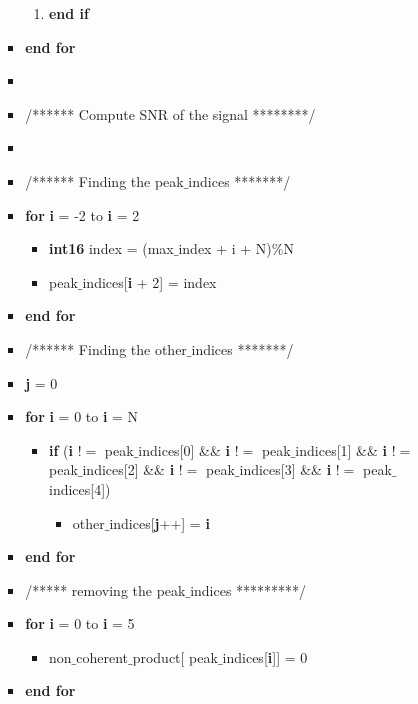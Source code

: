 \documentclass[journal,10pt,onecolumn]{article}
\begin{document}
\begin{itemize}
\begin{enumerate}
\begin{enumerate}
\begin{itemize}
\begin{enumerate}
               \item[] \textbf{end if}
            \end{enumerate}
            \item[] \textbf{end for} 
            \item[] 
            \item[] /****** Compute SNR of the signal ********/
            \item[] 
            \item[] /****** Finding the peak$\_$indices *******/
            \item[] \textbf{for} \textbf{i} = -2 to \textbf{i} = 2
            \begin{itemize}
                \item[] \textbf{int16} index = (max$\_$index + i + N)\%N
                \item[] peak$\_$indices[\textbf{i} + 2] = index
            \end{itemize}
            \item[] \textbf{end for}
            \item[] /****** Finding the other$\_$indices *******/
            \item[] \textbf{j} = 0
            \item[] \textbf{for} \textbf{i} = 0 to \textbf{i} = N
            \begin{itemize}
                \item[] \textbf{if} (\textbf{i} $!=$ peak$\_$indices[0] \&\& \textbf{i} $!=$ peak$\_$indices[1] \&\&  \textbf{i} $!=$ peak$\_$indices[2] \&\& \textbf{i} $!=$ peak$\_$indices[3] \&\& \textbf{i} $!=$ peak$\_$indices[4])
                \begin{itemize}
                    \item[] other$\_$indices[\textbf{j}++] = \textbf{i} 
                \end{itemize} 
            \end{itemize}
            \item[] \textbf{end for}
            \item[] /***** removing the peak$\_$indices *********/
            \item[] \textbf{for} \textbf{i} = 0 to \textbf{i} = 5
            \begin{itemize}
               \item[] non$\_$coherent$\_$product[ peak$\_$indices[\textbf{i}]] = 0
            \end{itemize}
            \item[] \textbf{end for}

\end{itemize}
\end{enumerate}
\end{enumerate}
\end{itemize}
\end{document}
